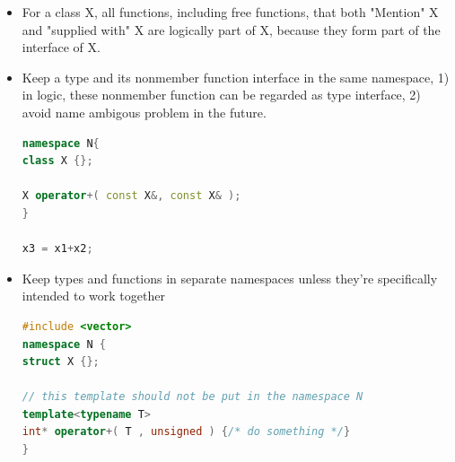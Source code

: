 \documentclass[a4paper,12pt,twoside]{book}
\begin{document}
\begin{itemize}
\item For a class X, all functions, including free functions, that both "Mention" X
and "supplied with" X are logically part of X, because they form part of the interface of X.

\item Keep a type and its nonmember function interface in the same namespace, 1) in logic, these nonmember function can be regarded as type interface, 2) avoid name ambigous problem in the future.
\begin{lstlisting}[frame=single, language=c++]
namespace N{
class X {};

X operator+( const X&, const X& );
}

x3 = x1+x2;
\end{lstlisting}

\item Keep types and functions in separate namespaces unless they're specifically intended to work together

\begin{lstlisting}[frame=single, language=c++]
#include <vector>
namespace N {
struct X {};

// this template should not be put in the namespace N
template<typename T>
int* operator+( T , unsigned ) {/* do something */}
}
\end{lstlisting}

\end{itemize}
\end{document}

